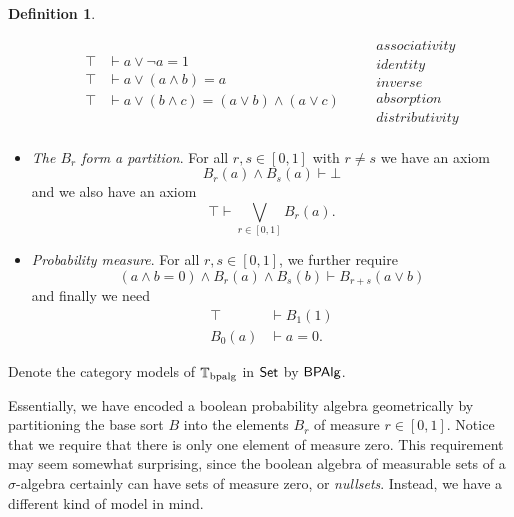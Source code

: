 \documentclass[a4paper]{amsproc}
\theoremstyle{plain}
\theoremstyle{definition}
\newtheorem{definition}[theorem]{Definition}
\theoremstyle{remark}
\numberwithin{equation}{section}
\newcommand{\Set}{\textup{\textsf{Set}}}
\newcommand{\BPAlg}{\textup{\textsf{BPAlg}}}
\begin{document}
\begin{definition}
\begin{itemize}
\begin{equation*}
\begin{split}
                \top &\vdash a \vee \neg{a} = 1 \\
                \top &\vdash a \vee (a \wedge b) = a \\
                \top &\vdash a \vee (b \wedge c) = (a \vee b) \wedge (a \vee c) \\
            \end{split}
            \quad
            \begin{split}
                &\textit{associativity} \\
                &\textit{identity} \\
                &\textit{inverse} \\
                &\textit{absorption} \\
                &\textit{distributivity} \\
            \end{split}
        \end{equation*}
        \item \textit{The $B_r$ form a partition}. For all $r, s \in [0,1]$ with $r \neq s$ we have an axiom
        \[
        B_r(a)  \wedge B_s(a) \vdash \bot
        \]
        and we also have an axiom
        \[
        \top \vdash \bigvee_{r \in [0,1]} B_r(a).
        \]
        \item \textit{Probability measure}. For all $r, s \in [0,1]$, we further require
        \[
        (a \wedge b = 0) \wedge B_r(a) \wedge B_s(b) \vdash B_{r+s}(a \vee b)
        \]
        and finally we need
        \begin{align*}
            \top & \vdash B_1(1) \\
            B_0(a) & \vdash a = 0.
        \end{align*}
    \end{itemize}
    Denote the category models of $\mathbb{T}_{\textup{bpalg}}$ in $\Set$ by $\BPAlg$.
\end{definition}

Essentially, we have encoded a boolean probability algebra geometrically by partitioning the base sort $B$ into the elements $B_r$ of measure $r \in [0,1]$. Notice that we require that there is only one element of measure zero. This requirement may seem somewhat surprising, since the boolean algebra of measurable sets of a $\sigma$-algebra certainly can have sets of measure zero, or \emph{nullsets}. Instead, we have a different kind of model in mind.
\end{document}
